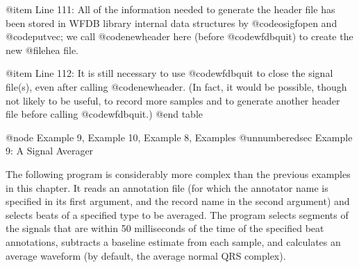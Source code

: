 {{{{{{{{{{@item Line 111:
All of the information needed to generate the header file has been
stored in WFDB library internal data structures by @code{osigfopen} and 
@code{putvec};  we call @code{newheader} here (before @code{wfdbquit}) to
create the new @file{hea} file.

@item Line 112:
It is still necessary to use @code{wfdbquit} to close the signal file(s),
even after calling @code{newheader}.  (In fact, it would be possible,
though not likely to be useful, to record more samples and to generate
another header file before calling @code{wfdbquit}.)
@end table

@node     Example 9, Example 10, Example 8, Examples
@unnumberedsec Example 9: A Signal Averager

The following program is considerably more complex than the previous examples
in this chapter.  It reads an annotation file (for which the annotator name
is specified in its first argument, and the record name in the second
argument) and selects beats of a specified type to be averaged.  The
program selects segments of the signals that are within 50 milliseconds of the
time of the specified beat annotations, subtracts a baseline estimate
from each sample, and calculates an average waveform (by default, the
average normal QRS complex).

}}}}}}}}}}
